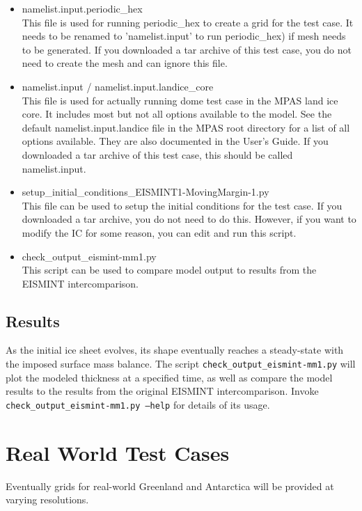 \begin{itemize}
\item namelist.input.periodic\_hex \\
 This file is used for running periodic\_hex to create a grid for the test case.  It needs to be renamed to 'namelist.input' to run periodic\_hex) if mesh needs to be generated.  If you downloaded a tar archive of this test case, you do not need to create the mesh and can ignore this file.

\item namelist.input / namelist.input.landice\_core \\
This file is used for actually running dome test case in the MPAS land ice core.  It includes most but not all options available to the model.  See the default namelist.input.landice file in the MPAS root directory for a list of all options available.  They are also documented in the User's Guide.  If you downloaded a tar archive of this test case, this should be called namelist.input.

\item setup\_initial\_conditions\_EISMINT1-MovingMargin-1.py \\
This file can be used to setup the initial conditions for the test case.  If you downloaded a tar archive, you do not need to do this.  However, if you want to modify the IC for some reason, you can edit and run this script.

\item check\_output\_eismint-mm1.py \\
This script can be used to compare model output to results from the EISMINT intercomparison.
\end{itemize}

\subsection{Results}
\label{subsecc:eismint_results}
As the initial ice sheet evolves, its shape eventually reaches a steady-state with the imposed surface mass balance.  The script \texttt{check\_output\_eismint-mm1.py} will plot the modeled thickness at a specified time, as well as compare the model results to the results from the original EISMINT intercomparison.  Invoke \texttt{check\_output\_eismint-mm1.py --help} for details of its usage.


\section{Real World Test Cases}
Eventually grids for real-world Greenland and Antarctica will be provided at varying resolutions.


